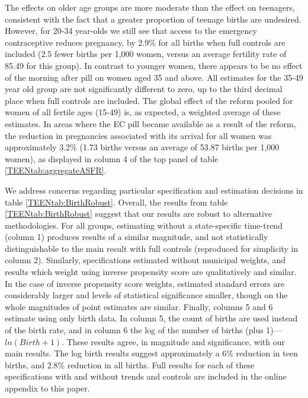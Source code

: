 The effects on older age groups are more moderate than the effect on teenagers,
consistent with the fact that a greater proportion of teenage births are
undesired.  However, for 20-34 year-olds we still see that access to the 
emergency contraceptive reduces pregnancy, by 2.9\% for all births when full 
controls are included (2.5 fewer births per 1,000 women, versus an average
fertility rate of 85.49 for this group).  In contrast to younger women, there 
appears to be no effect of the morning after pill on women aged 35 and above.  
All estimates for the 35-49 year old group are not significantly different to 
zero, up to the third decimal place when full controls are included.  The global 
effect of the reform pooled for women of all fertile ages (15-49) is, as 
expected, a weighted average of these estimates.  In areas where the EC pill
became available as a result of the reform, the reduction in pregnancies 
associated with its arrival for all women was approximately 3.2\% (1.73 births
versus an average of 53.87 births per 1,000 women), as displayed in column 4 of
the top panel of table \ref{TEENtab:aggregateASFR}.

We address concerns regarding particular specification and estimation decisions
in table \ref{TEENtab:BirthRobust}.  Overall, the results from table 
\ref{TEENtab:BirthRobust} suggest that our results are robust to alternative
methodologies.  For all groups, estimating without a state-specific time-trend
(column 1) produces results of a similar magnitude, and not statistically
distinguishable to the main result with full controls (reproduced for simplicity
in column 2).  Similarly, specifications estimated without municipal weights,
and results which weight using inverse propensity score are qualitatively and
similar.  In the case of inverse propensity score weights, estimated standard
errors are considerably larger and levels of statistical significance smaller,
though on the whole magnitudes of point estimates are similar.  Finally, columns
5 and 6 estimate using only birth data.  In column 5, the count of births are
used instead of the birth rate, and in column 6 the log of the number of births
(plus 1)---$ln(Birth+1)$.  These results agree, in magnitude and significance,
with our main results.  The log birth results suggest approximately a 6\%
reduction in teen births, and 2.8\% reduction in all births.  Full results for
each of these specifications with and without trends and controls are included
in the online appendix to this paper.


